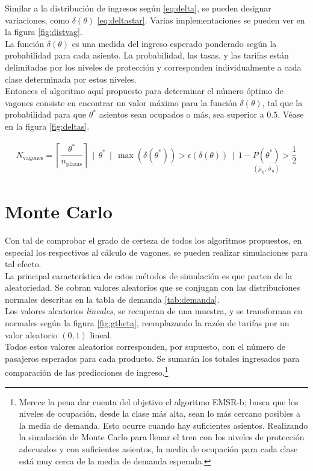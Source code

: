 \documentclass[12pt]{article}
\begin{document}
Similar a la distribución de ingresos según \eqref{eq:delta}, se pueden designar variaciones, como $\delta(\theta)$ \eqref{eq:deltastar}. Varias implementaciones se pueden ver en la figura \nolinebreak \ref{fig:distvag}.\\

La función $\delta(\theta)$ es una medida del ingreso esperado ponderado según la probabilidad para cada asiento. La probabilidad, las tasas, y las tarifas están delimitadas por los niveles de protección y corresponden individualmente a cada clase determinada por estos niveles.\\

Entonces el algoritmo aquí propuesto para determinar el número óptimo de vagones consiste en encontrar un valor máximo para la función $\delta(\theta)$, tal que la probabilidad para que $\theta^*$ asientos sean ocupados o más, sea superior a $0.5$. Véase en la figura \ref{fig:deltas}.


\begin{align}
N_{\text{vagones}} = \left\lceil\dfrac{\theta^*}{n_{\text{plazas}}}\right\rceil \, \mid \, \theta^* \, \mid \, \max\left(\delta(\theta^*)\right) > \epsilon\left(\delta(\theta)\right) \,\mid \, 1 - \underset{(\overline{\mu}_n , \, \overline{\sigma}_n)}{P(\theta^*)} > \dfrac{1}{2}
\end{align}





\section{Monte Carlo}

Con tal de comprobar el grado de certeza de todos los algoritmos propuestos, en especial los respectivos al cálculo de vagones, se pueden realizar simulaciones para tal efecto.\\

La principal característica de estos métodos de simulación es que parten de la aleatoriedad. Se cobran valores aleatorios que se conjugan con las distribuciones normales descritas en la tabla de demanda \ref{tab:demanda}.\\

Los valores aleatorios \emph{lineales}, se recuperan de una muestra, y se transforman en normales según la figura \ref{fig:gtheta}, reemplazando la razón de tarifas por un valor aleatorio $(0,1)$ lineal.\\

Todos estos valores aleatorios corresponden, por supuesto, con el número de pasajeros esperados para cada producto. Se sumarán los totales ingresados para comparación de las predicciones de ingreso.\footnote{Merece la pena dar cuenta del objetivo el algoritmo EMSR-b; busca que los niveles de ocupación, desde la clase más alta, sean lo más cercano posibles a la media de demanda. Esto ocurre cuando hay suficientes asientos. Realizando la simulación de Monte Carlo para llenar el tren con los niveles de protección adecuados y con suficientes asientos, la media de ocupación para cada clase está muy cerca de la media de demanda esperada.}\\
\end{document}
